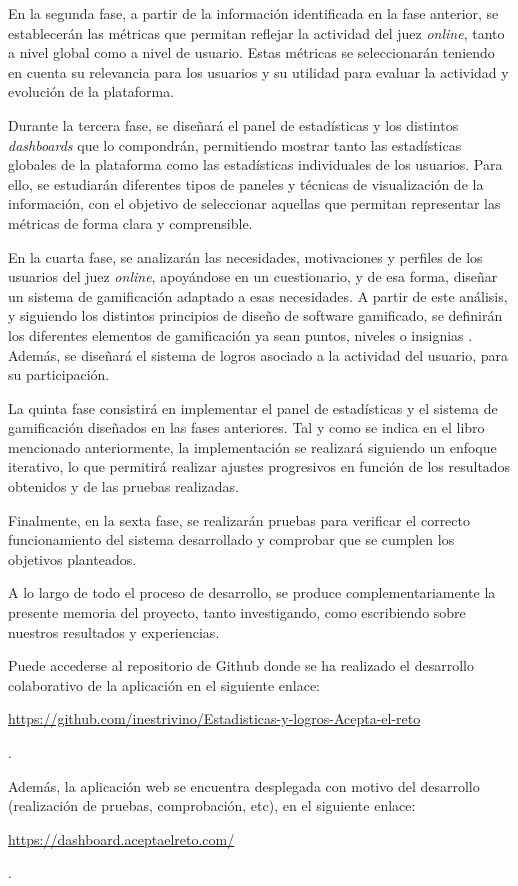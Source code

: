 En la segunda fase, a partir de la información identificada en la fase anterior, se establecerán las métricas que permitan reflejar la actividad del juez \textit{online}, tanto a nivel global como a nivel de usuario. Estas métricas se seleccionarán teniendo en cuenta su relevancia para los usuarios y su utilidad para evaluar la actividad y evolución de la plataforma. 

Durante la tercera fase, se diseñará el panel de estadísticas y los distintos \textit{dashboards} que lo compondrán, permitiendo mostrar tanto las estadísticas globales de la plataforma como las estadísticas individuales de los usuarios. Para ello, se estudiarán diferentes tipos de paneles y técnicas de visualización de la información, con el objetivo de seleccionar aquellas que permitan representar las métricas de forma clara y comprensible. 

En la cuarta fase, se analizarán las necesidades, motivaciones y perfiles de los usuarios del juez \textit{online}, apoyándose en un cuestionario, y de esa forma, diseñar un sistema de gamificación adaptado a esas necesidades. A partir de este análisis, y siguiendo los distintos principios de diseño de software gamificado, se definirán los diferentes elementos de gamificación ya sean puntos, niveles o insignias \cite{Zichermann_Cunningham_2011}. Además, se diseñará el sistema de logros asociado a la actividad del usuario, para su participación.

La quinta fase consistirá en implementar el panel de estadísticas y el sistema de gamificación diseñados en las fases anteriores. Tal y como se indica en el libro mencionado anteriormente, la implementación se realizará siguiendo un enfoque iterativo, lo que permitirá realizar ajustes progresivos en función de los resultados obtenidos y de las pruebas realizadas. 

Finalmente, en la sexta fase, se realizarán pruebas para verificar el correcto funcionamiento del sistema desarrollado y comprobar que se cumplen los objetivos planteados. 

A lo largo de todo el proceso de desarrollo, se produce complementariamente la presente memoria del proyecto, tanto investigando, como escribiendo sobre nuestros resultados y experiencias.

Puede accederse al repositorio de Github donde se ha realizado el desarrollo colaborativo de la aplicación en el siguiente enlace:
\begin{center}
\url{https://github.com/inestrivino/Estadisticas-y-logros-Acepta-el-reto}
\end{center}.

Además, la aplicación web se encuentra desplegada con motivo del desarrollo (realización de pruebas, comprobación, etc), en el siguiente enlace:
\begin{center}
\url{https://dashboard.aceptaelreto.com/}
\end{center}.